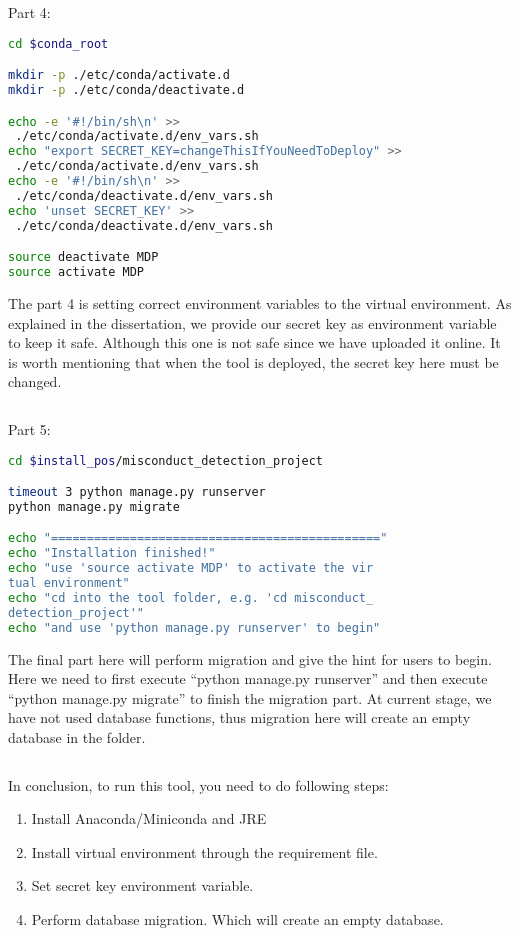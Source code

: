 \documentclass[twoside,a4paper]{refart}
\begin{document}
$\ $

Part 4:
\begin{lstlisting}[language=bash]
cd $conda_root

mkdir -p ./etc/conda/activate.d
mkdir -p ./etc/conda/deactivate.d

echo -e '#!/bin/sh\n' >>
 ./etc/conda/activate.d/env_vars.sh
echo "export SECRET_KEY=changeThisIfYouNeedToDeploy" >>
 ./etc/conda/activate.d/env_vars.sh
echo -e '#!/bin/sh\n' >>
 ./etc/conda/deactivate.d/env_vars.sh
echo 'unset SECRET_KEY' >>
 ./etc/conda/deactivate.d/env_vars.sh

source deactivate MDP
source activate MDP
\end{lstlisting}

The part 4 is setting correct environment variables to the virtual environment. As explained in the dissertation, we provide our secret key as environment variable to keep it safe. Although this one is not safe since we have uploaded it online. It is worth mentioning that when the tool is deployed, the secret key here must be changed.

$\ $

Part 5:
\begin{lstlisting}[language=bash]
cd $install_pos/misconduct_detection_project

timeout 3 python manage.py runserver
python manage.py migrate

echo "=============================================="
echo "Installation finished!"
echo "use 'source activate MDP' to activate the vir
tual environment"
echo "cd into the tool folder, e.g. 'cd misconduct_
detection_project'"
echo "and use 'python manage.py runserver' to begin"
\end{lstlisting}

The final part here will perform migration and give the hint for users to begin. Here we need to first execute \enquote{python manage.py runserver} and then execute \enquote{python manage.py migrate} to finish the migration part. At current stage, we have not used database functions, thus migration here will create an empty database in the folder.

$\ $

In conclusion, to run this tool, you need to do following steps:
\begin{enumerate}
\item Install Anaconda/Miniconda and JRE
\item Install virtual environment through the requirement file.
\item Set secret key environment variable.
\item Perform database migration. Which will create an empty database.
\end{enumerate}

%
%
%

\printindex
\end{document}
